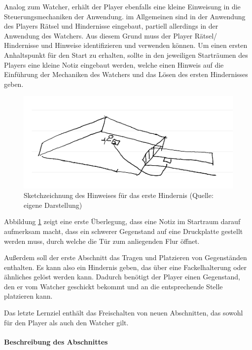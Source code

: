 Analog zum Watcher, erhält der Player ebenfalls eine kleine Einweisung in die Steuerungsmechaniken der Anwendung. im Allgemeinen sind in der Anwendung des Players Rätsel und Hindernisse eingebaut, partiell allerdings in der Anwendung des Watchers. Aus diesem Grund muss der Player Rätsel/ Hindernisse und Hinweise identifizieren und verwenden können. Um einen ersten Anhaltspunkt für den Start zu erhalten, sollte in den jeweiligen Starträumen des Players eine kleine Notiz eingebaut werden, welche einen Hinweis auf die Einführung der Mechaniken des Watchers und das Lösen des ersten Hindernisses geben.
\begin{figure}[ht]
\centering
\includegraphics[width=1\linewidth]{content/pictures/Startroom_Sketch.png}
\caption{Sketchzeichnung des Hinweises für das erste Hindernis (Quelle: eigene Darstellung)}
\label{fig:sketch-startriddle}
\end{figure}

Abbildung \ref{fig:sketch-startriddle} zeigt eine erste Überlegung, dass eine Notiz im Startraum darauf aufmerksam macht, dass ein schwerer Gegenstand auf eine Druckplatte gestellt werden muss, durch welche die Tür zum anliegenden Flur öffnet.

Außerdem soll der erste Abschnitt das Tragen und Platzieren von Gegenständen enthalten. Es kann also ein Hindernis geben, das über eine Fackelhalterung oder ähnliches gelöst werden kann. Dadurch benötigt der Player einen Gegenstand, den er vom Watcher geschickt bekommt und an die entsprechende Stelle platzieren kann.

Das letzte Lernziel enthält das Freischalten von neuen Abschnitten, das sowohl für den Player als auch den Watcher gilt.

\paragraph{Beschreibung des Abschnittes}

